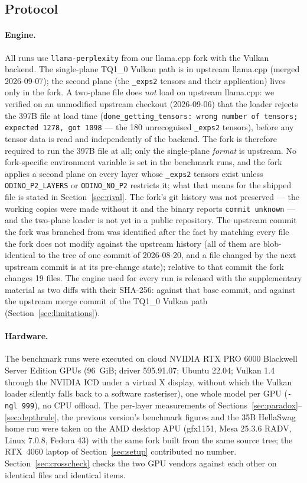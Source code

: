 \documentclass[10pt]{article} %
\begin{document}
\subsection{Protocol}
\label{sec:protocol}

\paragraph{Engine.} All runs use \texttt{llama-perplexity} from our llama.cpp
fork with the Vulkan backend. The single-plane TQ1\_0 Vulkan path is in
upstream llama.cpp (merged 2026-09-07); the second plane (the
\texttt{\_exps2} tensors and their application) lives only in the fork. A
two-plane file does \emph{not} load on upstream llama.cpp: we verified on an
unmodified upstream checkout (2026-09-06) that the loader rejects the 397B
file at load time (\texttt{done\_getting\_tensors: wrong number of tensors;
expected 1278, got 1098} --- the 180 unrecognised \texttt{\_exps2} tensors),
before any tensor data is read and independently of the backend. The fork is
therefore required to run the 397B file at all; only the single-plane
\emph{format} is upstream. No fork-specific environment variable is set in the
benchmark runs, and the fork applies a second plane on every layer whose
\texttt{\_exps2} tensors exist unless \texttt{ODINO\_P2\_LAYERS} or
\texttt{ODINO\_NO\_P2} restricts it; what that means for the shipped file is
stated in Section~\ref{sec:rival}. The fork's git history was not preserved
--- the working copies were made without it and the binary reports
\texttt{commit unknown} --- and the two-plane loader is not yet in a public
repository. The upstream commit the fork was branched from was identified
after the fact by matching every file the fork does not modify against the
upstream history (all of them are blob-identical to the tree of one commit of
2026-08-20, and a file changed by the next upstream commit is at its
pre-change state); relative to that commit the fork changes 19 files. The
engine used for every run is released with the supplementary material as two
diffs with their SHA-256: against that base commit, and against the upstream
merge commit of the TQ1\_0 Vulkan path (Section~\ref{sec:limitations}).

\paragraph{Hardware.} The benchmark runs were executed on cloud NVIDIA RTX PRO
6000 Blackwell Server Edition GPUs (96~GiB; driver 595.91.07; Ubuntu 22.04;
Vulkan 1.4 through the NVIDIA ICD under a virtual X display, without which the
Vulkan loader silently falls back to a software rasteriser), one whole model per
GPU (\texttt{-ngl 999}), no CPU offload. The per-layer measurements of
Sections~\ref{sec:paradox}--\ref{sec:depthrule}, the previous version's
benchmark figures and the 35B HellaSwag home run were taken on the AMD desktop
APU (gfx1151, Mesa 25.3.6 RADV, Linux 7.0.8, Fedora 43) with the same fork
built from the same source tree; the RTX~4060 laptop of Section~\ref{sec:setup}
contributed no number.
Section~\ref{sec:crosscheck} checks the two GPU vendors against each other on
identical files and identical items.
\end{document}
